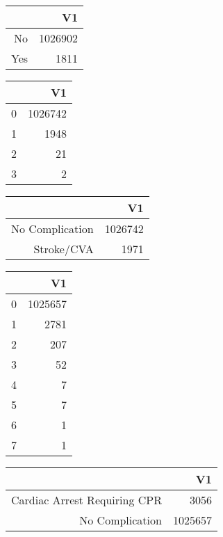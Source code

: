 \bigskip\bigskip
\centering
\begin{tabular}{rr}
  \hline
 & V1 \\ 
  \hline
No & 1026902 \\ 
  Yes & 1811 \\ 
   \hline
\end{tabular}

\bigskip\bigskip
\centering
\begin{tabular}{rr}
  \hline
 & V1 \\ 
  \hline
0 & 1026742 \\ 
  1 & 1948 \\ 
  2 &  21 \\ 
  3 &   2 \\ 
   \hline
\end{tabular}

\bigskip\bigskip
\centering
\begin{tabular}{rr}
  \hline
 & V1 \\ 
  \hline
No Complication & 1026742 \\ 
  Stroke/CVA & 1971 \\ 
   \hline
\end{tabular}

\bigskip\bigskip
\centering
\begin{tabular}{rr}
  \hline
 & V1 \\ 
  \hline
0 & 1025657 \\ 
  1 & 2781 \\ 
  2 & 207 \\ 
  3 &  52 \\ 
  4 &   7 \\ 
  5 &   7 \\ 
  6 &   1 \\ 
  7 &   1 \\ 
   \hline
\end{tabular}

\bigskip\bigskip
\centering
\begin{tabular}{rr}
  \hline
 & V1 \\ 
  \hline
Cardiac Arrest Requiring CPR & 3056 \\ 
  No Complication & 1025657 \\ 
   \hline
\end{tabular}

